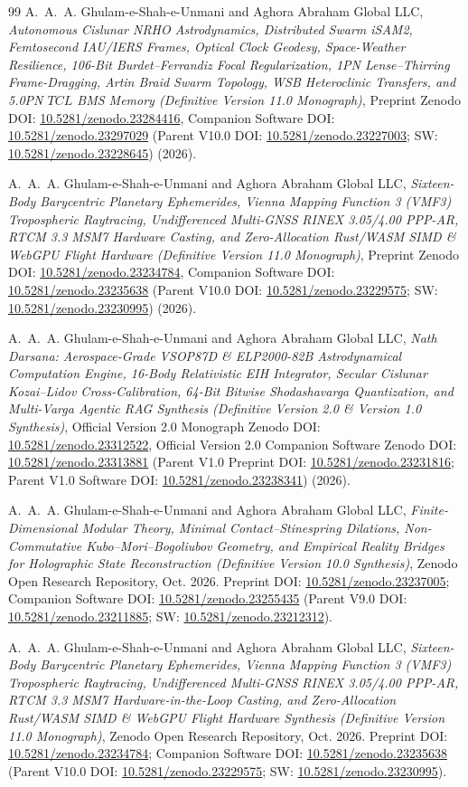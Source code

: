 \documentclass[11pt,a4paper,reqno]{article}
\def\texttt#1{#1}%
\def\mathrm#1{#1}%
\newcommand{\zenodo}[1]{\href{https://doi.org/10.5281/zenodo.#1}{\texttt{10.5281/\allowbreak zenodo.#1}}}
\theoremstyle{plain}
\theoremstyle{definition}
\theoremstyle{remark}
\numberwithin{equation}{section}
\begin{document}
\begin{thebibliography}{99}
A.~A.~A. Ghulam-e-Shah-e-Unmani and {Aghora Abraham Global LLC},
\emph{Autonomous Cislunar NRHO Astrodynamics, Distributed Swarm iSAM2, Femtosecond IAU/IERS Frames, Optical Clock Geodesy, Space-Weather Resilience, 106-Bit Burdet--Ferrandiz Focal Regularization, 1PN Lense--Thirring Frame-Dragging, Artin Braid Swarm Topology, WSB Heteroclinic Transfers, and 5.0PN $\mathrm{TCL}$ BMS Memory (Definitive Version 11.0 Monograph)},
Preprint Zenodo DOI: \zenodo{23284416},
Companion Software DOI: \zenodo{23297029} (Parent V10.0 DOI: \zenodo{23227003}; SW: \zenodo{23228645}) (2026).

A.~A.~A. Ghulam-e-Shah-e-Unmani and {Aghora Abraham Global LLC},
\emph{Sixteen-Body Barycentric Planetary Ephemerides, Vienna Mapping Function 3 (VMF3) Tropospheric Raytracing, Undifferenced Multi-GNSS RINEX 3.05/4.00 PPP-AR, RTCM 3.3 MSM7 Hardware Casting, and Zero-Allocation Rust/WASM SIMD \& WebGPU Flight Hardware (Definitive Version 11.0 Monograph)},
Preprint Zenodo DOI: \zenodo{23234784},
Companion Software DOI: \zenodo{23235638} (Parent V10.0 DOI: \zenodo{23229575}; SW: \zenodo{23230995}) (2026).

A.~A.~A. Ghulam-e-Shah-e-Unmani and {Aghora Abraham Global LLC},
\emph{Nath Darsana: Aerospace-Grade VSOP87D \& ELP2000-82B Astrodynamical Computation Engine, 16-Body Relativistic EIH Integrator, Secular Cislunar Kozai--Lidov Cross-Calibration, 64-Bit Bitwise Shodashavarga Quantization, and Multi-Varga Agentic RAG Synthesis (Definitive Version 2.0 \& Version 1.0 Synthesis)},
Official Version 2.0 Monograph Zenodo DOI: \zenodo{23312522},
Official Version 2.0 Companion Software Zenodo DOI: \zenodo{23313881}
(Parent V1.0 Preprint DOI: \zenodo{23231816}; Parent V1.0 Software DOI: \zenodo{23238341}) (2026).

A.~A.~A. Ghulam-e-Shah-e-Unmani and {Aghora Abraham Global LLC},
\emph{Finite-Dimensional Modular Theory, Minimal Contact--Stinespring Dilations, Non-Commutative Kubo--Mori--Bogoliubov Geometry, and Empirical Reality Bridges for Holographic State Reconstruction (Definitive Version 10.0 Synthesis)},
Zenodo Open Research Repository, Oct. 2026.
Preprint DOI: \zenodo{23237005}; Companion Software DOI: \zenodo{23255435} (Parent V9.0 DOI: \zenodo{23211885}; SW: \zenodo{23212312}).

A.~A.~A. Ghulam-e-Shah-e-Unmani and {Aghora Abraham Global LLC},
\emph{Sixteen-Body Barycentric Planetary Ephemerides, Vienna Mapping Function 3 (VMF3) Tropospheric Raytracing, Undifferenced Multi-GNSS RINEX 3.05/4.00 PPP-AR, RTCM 3.3 MSM7 Hardware-in-the-Loop Casting, and Zero-Allocation Rust/WASM SIMD \& WebGPU Flight Hardware Synthesis (Definitive Version 11.0 Monograph)},
Zenodo Open Research Repository, Oct. 2026.
Preprint DOI: \zenodo{23234784}; Companion Software DOI: \zenodo{23235638} (Parent V10.0 DOI: \zenodo{23229575}; SW: \zenodo{23230995}).


\end{thebibliography}
\end{document}
